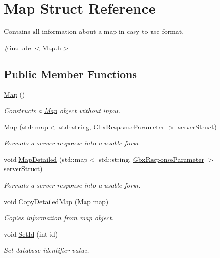 \hypertarget{structMap}{\section{Map Struct Reference}
\label{structMap}
}


Contains all information about a map in easy-\/to-\/use format.  




{\ttfamily \#include $<$Map.\-h$>$}

\subsection*{Public Member Functions}
\begin{DoxyCompactItemize}
\item 
\hypertarget{structMap_a0f5ad0fd4563497b4214038cbca8b582}{\hyperlink{structMap_a0f5ad0fd4563497b4214038cbca8b582}{Map} ()}\label{structMap_a0f5ad0fd4563497b4214038cbca8b582}

\begin{DoxyCompactList}\small\item\em Constructs a \hyperlink{structMap}{Map} object without input. \end{DoxyCompactList}\item 
\hyperlink{structMap_a95a2cda9b2746b5ba75e811930559c1f}{Map} (std\-::map$<$ std\-::string, \hyperlink{classGbxResponseParameter}{Gbx\-Response\-Parameter} $>$ server\-Struct)
\begin{DoxyCompactList}\small\item\em Formats a server response into a usable form. \end{DoxyCompactList}\item 
void \hyperlink{structMap_ac8e78e5d9ba3951db798736fc33e907e}{Map\-Detailed} (std\-::map$<$ std\-::string, \hyperlink{classGbxResponseParameter}{Gbx\-Response\-Parameter} $>$ server\-Struct)
\begin{DoxyCompactList}\small\item\em Formats a server response into a usable form. \end{DoxyCompactList}\item 
void \hyperlink{structMap_aceca3c7bca81223e4b54de1cc91f7a31}{Copy\-Detailed\-Map} (\hyperlink{structMap}{Map} map)
\begin{DoxyCompactList}\small\item\em Copies information from map object. \end{DoxyCompactList}\item 
void \hyperlink{structMap_af83b3a784e6fa9404c1940a2ca1b68a8}{Set\-Id} (int id)
\begin{DoxyCompactList}\small\item\em Set database identifier value. \end{DoxyCompactList}\end{DoxyCompactItemize}
